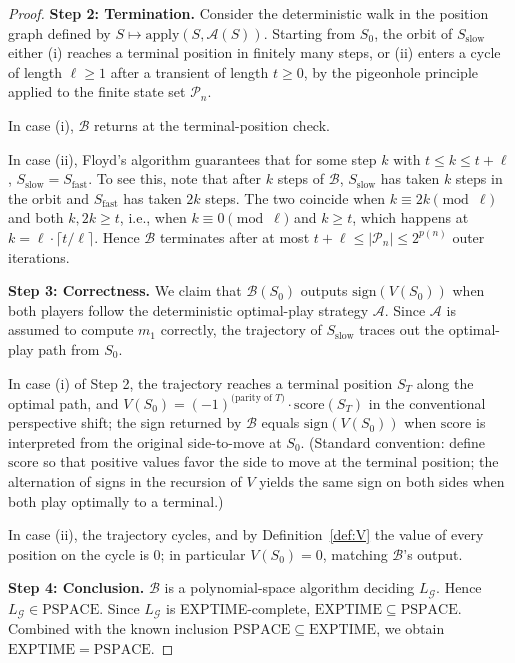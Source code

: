\documentclass[11pt,a4paper]{amsart}
\theoremstyle{plain}
\theoremstyle{definition}
\theoremstyle{remark}
\newcommand{\EXPTIME}{\mathrm{EXPTIME}}
\newcommand{\PSPACE}{\mathrm{PSPACE}}
\newcommand{\Apply}{\mathrm{apply}}
\newcommand{\score}{\mathrm{score}}
\begin{document}
\begin{proof}
\medskip
\noindent\textbf{Step 2: Termination.}
Consider the deterministic walk in the position graph defined by
$S \mapsto \Apply(S, \mathcal{A}(S))$. Starting from $S_0$, the orbit
of $S_{\mathrm{slow}}$ either (i) reaches a terminal position in
finitely many steps, or (ii) enters a cycle of length $\ell \geq 1$
after a transient of length $t \geq 0$, by the pigeonhole principle
applied to the finite state set $\mathcal{P}_n$.

In case (i), $\mathcal{B}$ returns at the terminal-position check.

In case (ii), Floyd's algorithm \cite{Flo67} guarantees that for some
step $k$ with $t \leq k \leq t + \ell$,
$S_{\mathrm{slow}} = S_{\mathrm{fast}}$. To see this, note that after
$k$ steps of $\mathcal{B}$, $S_{\mathrm{slow}}$ has taken $k$ steps in
the orbit and $S_{\mathrm{fast}}$ has taken $2k$ steps. The two
coincide when $k \equiv 2k \pmod{\ell}$ and both $k, 2k \geq t$, i.e.,
when $k \equiv 0 \pmod{\ell}$ and $k \geq t$, which happens at
$k = \ell \cdot \lceil t / \ell \rceil$. Hence $\mathcal{B}$ terminates
after at most $t + \ell \leq |\mathcal{P}_n| \leq 2^{p(n)}$ outer
iterations.

\medskip
\noindent\textbf{Step 3: Correctness.}
We claim that $\mathcal{B}(S_0)$ outputs $\mathrm{sign}(V(S_0))$ when
both players follow the deterministic optimal-play strategy
$\mathcal{A}$. Since $\mathcal{A}$ is assumed to compute $m_1$
correctly, the trajectory of $S_{\mathrm{slow}}$ traces out the
optimal-play path from $S_0$.

In case (i) of Step 2, the trajectory reaches a terminal position
$S_T$ along the optimal path, and $V(S_0) = (-1)^{\text{(parity of } T)}
\cdot \score(S_T)$ in the conventional perspective shift; the sign
returned by $\mathcal{B}$ equals $\mathrm{sign}(V(S_0))$ when
$\score$ is interpreted from the original side-to-move at $S_0$.
(Standard convention: define $\score$ so that positive values favor
the side to move at the terminal position; the alternation of signs
in the recursion of $V$ yields the same sign on both sides when both
play optimally to a terminal.)

In case (ii), the trajectory cycles, and by Definition~\ref{def:V} the
value of every position on the cycle is $0$; in particular
$V(S_0) = 0$, matching $\mathcal{B}$'s output.

\medskip
\noindent\textbf{Step 4: Conclusion.}
$\mathcal{B}$ is a polynomial-space algorithm deciding $L_\mathcal{G}$.
Hence $L_\mathcal{G} \in \PSPACE$. Since $L_\mathcal{G}$ is
EXPTIME-complete, $\EXPTIME \subseteq \PSPACE$. Combined with the
known inclusion $\PSPACE \subseteq \EXPTIME$, we obtain
$\EXPTIME = \PSPACE$.
\end{proof}
\end{document}
